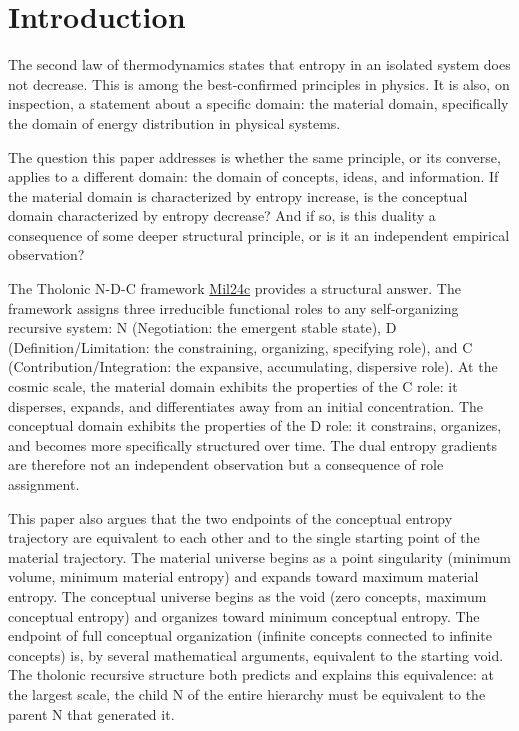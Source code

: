 \documentclass[12pt]{article}
\begin{document}
\section{Introduction}\label{introduction}

The second law of thermodynamics states that entropy in an isolated
system does not decrease. This is among the best-confirmed principles in
physics. It is also, on inspection, a statement about a specific domain:
the material domain, specifically the domain of energy distribution in
physical systems.

The question this paper addresses is whether the same principle, or its
converse, applies to a different domain: the domain of concepts, ideas,
and information. If the material domain is characterized by entropy
increase, is the conceptual domain characterized by entropy decrease?
And if so, is this duality a consequence of some deeper structural
principle, or is it an independent empirical observation?

The Tholonic N-D-C framework
\href{https://github.com/baardev/truevalue/blob/main/docnav/Research/papers/3_minimal-recursive-triadic-framework/3_minimal-recursive-triadic-framework.pdf}{Mil24c}
provides a structural answer. The framework assigns three irreducible
functional roles to any self-organizing recursive system: N
(Negotiation: the emergent stable state), D (Definition/Limitation: the
constraining, organizing, specifying role), and C
(Contribution/Integration: the expansive, accumulating, dispersive
role). At the cosmic scale, the material domain exhibits the properties
of the C role: it disperses, expands, and differentiates away from an
initial concentration. The conceptual domain exhibits the properties of
the D role: it constrains, organizes, and becomes more specifically
structured over time. The dual entropy gradients are therefore not an
independent observation but a consequence of role assignment.

This paper also argues that the two endpoints of the conceptual entropy
trajectory are equivalent to each other and to the single starting point
of the material trajectory. The material universe begins as a point
singularity (minimum volume, minimum material entropy) and expands
toward maximum material entropy. The conceptual universe begins as the
void (zero concepts, maximum conceptual entropy) and organizes toward
minimum conceptual entropy. The endpoint of full conceptual organization
(infinite concepts connected to infinite concepts) is, by several
mathematical arguments, equivalent to the starting void. The tholonic
recursive structure both predicts and explains this equivalence: at the
largest scale, the child N of the entire hierarchy must be equivalent to
the parent N that generated it.
\end{document}
